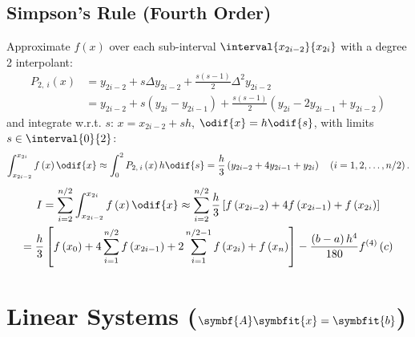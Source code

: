 \documentclass{article}
\begin{document}
\begin{minipage}[t]{126.1962963mm}
    \subsection{Simpson's Rule (Fourth Order)}
    Approximate \(f\left( x \right)\) over each sub-interval \(\interval{x_{2i - 2}}{x_{2i}}\) with a degree 2 interpolant:
    \begin{align*}
        P_{2,\: i}\left( x \right) & = y_{2i - 2} + s \Delta{y_{2i - 2}} + \frac{s\left( s - 1 \right)}{2} \Delta^2 y_{2i - 2}                                               \\
                                   & = y_{2i - 2} + s \left( y_{2i} - y_{2i - 1} \right) + \frac{s\left( s - 1 \right)}{2} \left( y_{2i} - 2 y_{2i - 1} + y_{2i - 2} \right)
    \end{align*}
    and integrate w.r.t. \(s\): \(x = x_{2i - 2} + s h\), \(\odif{x} = h \odif{s}\), with limits \(s \in \interval{0}{2}\):
    \begin{equation*}
        \int_{x_{2i - 2}}^{x_{2i}} f\left( x \right) \odif{x} \approx \int_0^2 P_{2,\: i}\left( x \right) h \odif{s} = \frac{h}{3} \left( y_{2i - 2} + 4y_{2i - 1} + y_{2i} \right) \quad \left(i = 1, 2, \ldots, n/2\right).
    \end{equation*}
    \begin{multline*}
        I = \sum_{i = 2}^{n/2}\int_{x_{2i - 2}}^{x_{2i}} f\left( x \right) \odif{x} \approx \sum_{i = 2}^{n/2} \frac{h}{3} \left[ f\left( x_{2i - 2} \right) + 4f\left( x_{2i - 1} \right) + f\left( x_{2i} \right) \right]                                                                                                               \\
        = \frac{h}{3} \left[ f\left( x_0 \right) + 4 \sum_{i = 1}^{n/2} f\left( x_{2i - 1} \right) + 2 \sum_{i = 1}^{n/2 - 1} f\left( x_{2i} \right) + f\left( x_n \right) \right] - \frac{\left( b - a \right)h^4}{180} f^{\left( 4 \right)}\left( c \right)
    \end{multline*}
\end{minipage}
\section{Linear Systems (\texorpdfstring{\(\symbf{A} \symbfit{x} = \symbfit{b}\)}{A x = b})}
\end{document}
